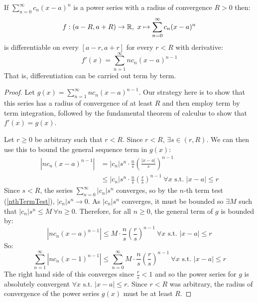 \documentclass[../main.tex]{subfiles}
\begin{document}
\begin{proposition}
  If $\sum_{n = 0}^{\infty} c_n(x - a)^{n}$ is a power series with a radius of convergence $R > 0$ then:
  \[
    f: (a - R, a + R) \to \mathbb{R},\ x \mapsto \sum_{n = 0}^{\infty} c_n(x - a)^{n}
  \]
  is differentiable on every $[a - r, a + r]$ for every $r < R$ with derivative:
  \[
    f'(x) = \sum_{n = 1}^{\infty} nc_n(x - a)^{n - 1}
  \]
  That is, differentiation can be carried out term by term.
\end{proposition}
\begin{proof}
  \nonexaminable
  Let $g(x) = \sum_{n = 1}^{\infty} nc_n(x - a)^{n - 1}$.
  Our strategy here is to show that this series has a radius of convergence of at least $R$ and then employ term by term integration, followed by the fundamental theorem of calculus to show that $f'(x) = g(x)$.

  Let $r \geq 0$ be arbitrary such that $r < R$.
  Since $r < R$, $\exists s \in (r, R)$.
  We can then use this to bound the general sequence term in $g(x)$:
  \begin{align*}
    |n c_n(x - a)^{n - 1}| &= |c_n|s^{n} \cdot \frac{n}{s}\left(\frac{|x - a|}{s}\right)^{n - 1} \\
                           &\leq |c_n|s^{n} \cdot \frac{n}{s}\left(\frac{r}{s}\right)^{n - 1}\ \forall x \text{ s.t. } |x - a| \leq r
  \end{align*}
  Since $s < R$, the series $\sum_{n=0}^{\infty} |c_n|s^{n}$ converges, so by the $n$-th term test (\cref{nthTermTest}), $|c_n|s^{n} \to 0$.
  As $|c_n|s^{n}$ converges, it must be bounded so $\exists M$ such that $|c_n|s^{n} \leq M\ \forall n \geq 0$.
  Therefore, for all $n \geq 0$, the general term of $g$ is bounded by:
  \[
    |n c_n(x - a)^{n - 1}| \leq M \cdot \frac{n}{s}\left(\frac{r}{s}\right)^{n - 1}\ \forall x \text{ s.t. } |x - a| \leq r
  \]
  So:
  \[
    \sum_{n = 1}^{\infty} |nc_n (x - 1)^{n - 1}| \leq \sum_{n = 0}^{\infty} M \cdot \frac{n}{s}\left(\frac{r}{s}\right)^{n - 1}\ \forall x \text{ s.t. } |x - a| \leq r
  \]
  The right hand side of this converges since $\frac{r}{s} < 1$ and so the power series for $g$ is absolutely convergent $\forall x \text{ s.t. } |x - a| \leq r$.
  Since $r < R$ was arbitrary, the radius of convergence of the power series $g(x)$ must be at least $R$.


\end{proof}
\end{document}
